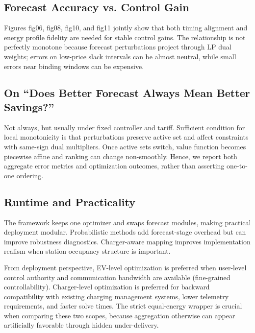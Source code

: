\documentclass[journal]{IEEEtran}
\begin{document}
\subsection{Forecast Accuracy vs. Control Gain}
Figures fig06, fig08, fig10, and fig11 jointly show that both timing alignment and energy profile fidelity are needed for stable control gains. The relationship is not perfectly monotone because forecast perturbations project through LP dual weights; errors on low-price slack intervals can be almost neutral, while small errors near binding windows can be expensive.

\subsection{On ``Does Better Forecast Always Mean Better Savings?''}
Not always, but usually under fixed controller and tariff. Sufficient condition for local monotonicity is that perturbations preserve active set and affect constraints with same-sign dual multipliers. Once active sets switch, value function becomes piecewise affine and ranking can change non-smoothly. Hence, we report both aggregate error metrics and optimization outcomes, rather than asserting one-to-one ordering.

\subsection{Runtime and Practicality}
The framework keeps one optimizer and swaps forecast modules, making practical deployment modular. Probabilistic methods add forecast-stage overhead but can improve robustness diagnostics. Charger-aware mapping improves implementation realism when station occupancy structure is important.

From deployment perspective, EV-level optimization is preferred when user-level control authority and communication bandwidth are available (fine-grained controllability). Charger-level optimization is preferred for backward compatibility with existing charging management systems, lower telemetry requirements, and faster solve times. The strict equal-energy wrapper is crucial when comparing these two scopes, because aggregation otherwise can appear artificially favorable through hidden under-delivery.
\end{document}
